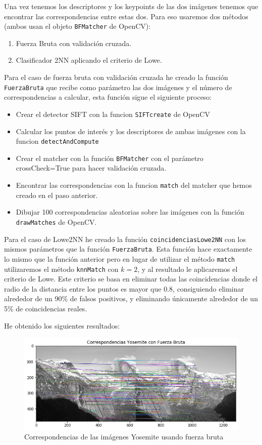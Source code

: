 \documentclass[12pt,spanish]{article}
\begin{document}
Una vez tenemos los descriptores y los keypoints de las dos imágenes tenemos que encontrar las correspondencias entre estas dos. Para eso usaremos dos métodos (ambos usan el objeto \texttt{BFMatcher} de OpenCV):

\begin{enumerate}
	\item Fuerza Bruta con validación cruzada.
	\item Clasificador 2NN aplicando el criterio de Lowe.
\end{enumerate}

Para el caso de fuerza bruta con validación cruzada he creado la función \texttt{FuerzaBruta} que recibe como parámetro las dos imágenes y el número de correspondencias a calcular, esta función sigue el siguiente proceso:

\begin{itemize}
	\item Crear el detector SIFT con la funcion \texttt{SIFTcreate} de OpenCV
	\item Calcular los puntos de interés y los descriptores de ambas imágenes con la funcion \texttt{detectAndCompute}
	\item Crear el matcher con la función \texttt{BFMatcher} con el parámetro crossCheck=True para hacer validación cruzada.
	\item Encontrar las correspondencias con la funcion \texttt{match} del matcher que hemos creado en el paso anterior.
	\item Dibujar 100 correspondencias aleatorias sobre las imágenes con la función \texttt{drawMatches} de OpenCV.
\end{itemize}

Para el caso de Lowe2NN he creado la función \texttt{coincidenciasLowe2NN} con los mismos parámetros que la función \texttt{FuerzaBruta}. Esta función hace exactamente lo mismo que la función anterior pero en lugar de utilizar el método \texttt{match} utilizaremos el método \texttt{knnMatch} con $k = 2$, y al resultado le aplicaremos el criterio de Lowe. Este criterio se basa en eliminar todas las coincidencias donde el radio de la distancia entre los puntos es mayor que $0.8$, consiguiendo eliminar alrededor de un 90\% de falsos positivos, y eliminando únicamente alrededor de un 5\% de coincidencias reales.

He obtenido los siguientes resultados:

\begin{figure}[H]
	\centering
	\includegraphics[width=12cm]{./imagenes_memoria/corrFB.png}
	\caption{Correspondencias de las imágenes Yosemite usando fuerza bruta}
	\label{kp_yose1}
\end{figure}
\end{document}
